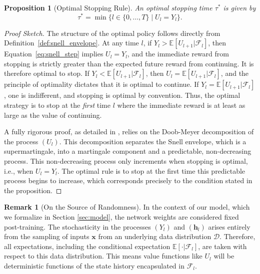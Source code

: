 \documentclass[12pt]{imsart}
\newcommand{\E}{\mathbb{E}}
\newcommand{\F}{\mathcal{F}}
\newcommand{\h}{\mathbf{h}}
\newcommand{\x}{\mathbf{x}}
\theoremstyle{plain}
\newtheorem{proposition}[theorem]{Proposition}
\theoremstyle{definition}
\newtheorem{remark}[theorem]{Remark}
\begin{document}
\begin{proposition}[Optimal Stopping Rule]
An optimal stopping time $\tau^*$ is given by
\begin{equation} \label{eq:snell_rule}
\tau^* = \min \{l \in \{0, \dots, T\} \mid U_l = Y_l \}.
\end{equation}
\end{proposition}
\begin{proof}[Proof Sketch]
The structure of the optimal policy follows directly from Definition~\ref{def:snell_envelope}. At any time $l$, if $Y_l > \E[U_{l+1} | \F_l]$, then Equation~\eqref{eq:snell_step} implies $U_l=Y_l$, and the immediate reward from stopping is strictly greater than the expected future reward from continuing. It is therefore optimal to stop. If $Y_l < \E[U_{l+1} | \F_l]$, then $U_l = \E[U_{l+1} | \F_l]$, and the principle of optimality dictates that it is optimal to continue. If $Y_l = \E[U_{l+1} | \F_l]$, one is indifferent, and stopping is optimal by convention. Thus, the optimal strategy is to stop at the \textit{first} time $l$ where the immediate reward is at least as large as the value of continuing.

A fully rigorous proof, as detailed in \citet{Peskir2006}, relies on the Doob-Meyer decomposition of the process $(U_l)$. This decomposition separates the Snell envelope, which is a supermartingale, into a martingale component and a predictable, non-decreasing process. This non-decreasing process only increments when stopping is optimal, i.e., when $U_l = Y_l$. The optimal rule is to stop at the first time this predictable process begins to increase, which corresponds precisely to the condition stated in the proposition.
\end{proof}

\begin{remark}[On the Source of Randomness]
\label{rem:prelim_randomness}
In the context of our model, which we formalize in Section \ref{sec:model}, the network weights are considered fixed post-training. The stochasticity in the processes $(Y_l)$ and $(\h_l)$ arises entirely from the sampling of inputs $\x$ from an underlying data distribution $\mathcal{D}$. Therefore, all expectations, including the conditional expectation $\E[\cdot | \F_l]$, are taken with respect to this data distribution. This means value functions like $U_l$ will be deterministic functions of the state history encapsulated in $\F_l$.
\end{remark}

\end{document}
